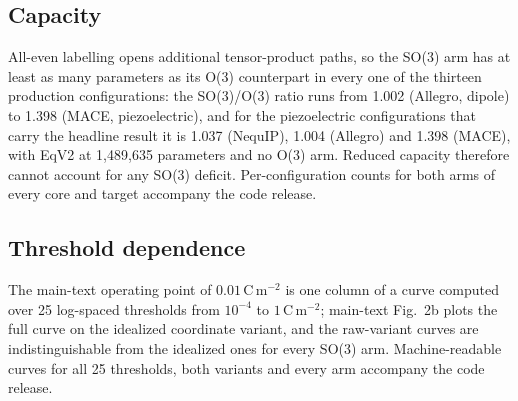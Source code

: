 \subsection*{Capacity}

All-even labelling opens additional tensor-product paths, so the SO(3) arm has at least as many parameters as its O(3) counterpart in every one of the thirteen production configurations: the SO(3)/O(3) ratio runs from 1.002 (Allegro, dipole) to 1.398 (MACE, piezoelectric), and for the piezoelectric configurations that carry the headline result it is 1.037 (NequIP), 1.004 (Allegro) and 1.398 (MACE), with EqV2 at 1{,}489{,}635 parameters and no O(3) arm. Reduced capacity therefore cannot account for any SO(3) deficit. Per-configuration counts for both arms of every core and target accompany the code release.

\label{snote:threshold}

\subsection*{Threshold dependence}

The main-text operating point of $0.01$\,C\,m$^{-2}$ is one column of a curve computed over 25 log-spaced thresholds from $10^{-4}$ to $1$\,C\,m$^{-2}$; main-text Fig.~2b plots the full curve on the idealized coordinate variant, and the raw-variant curves are indistinguishable from the idealized ones for every SO(3) arm. Machine-readable curves for all 25 thresholds, both variants and every arm accompany the code release.


